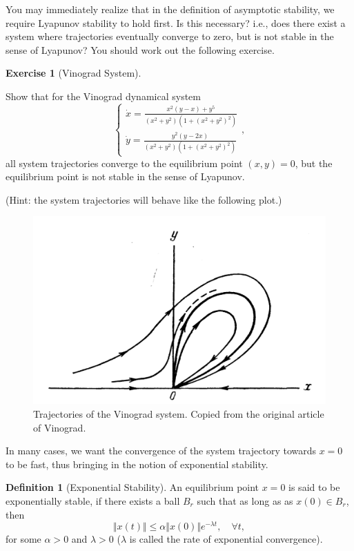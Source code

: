 \documentclass[
]{book}
\theoremstyle{definition}
\newtheorem{definition}{Definition}[chapter]
\theoremstyle{definition}
\theoremstyle{definition}
\newtheorem{exercise}{Exercise}[chapter]
\theoremstyle{definition}
\theoremstyle{remark}
\begin{document}
You may immediately realize that in the definition of asymptotic stability, we require Lyapunov stability to hold first. Is this necessary? i.e., does there exist a system where trajectories eventually converge to zero, but is not stable in the sense of Lyapunov? You should work out the following exercise.

\begin{exercise}[Vinograd System]
\protect\hypertarget{exr:vinogradequation}{}\label{exr:vinogradequation}

Show that for the Vinograd dynamical system \citep{vinograd57-inapplicability}
\[
\begin{cases}
\dot{x} = \frac{x^2(y-x) + y^5}{(x^2+y^2)(1 + (x^2+y^2)^2)} \\
\dot{y} = \frac{y^2 (y - 2x)}{(x^2+y^2)(1 + (x^2+y^2)^2)}
\end{cases},
\]
all system trajectories converge to the equilibrium point \((x,y) = 0\), but the equilibrium point is not stable in the sense of Lyapunov.

(Hint: the system trajectories will behave like the following plot.)

\begin{figure}

{\centering \includegraphics[width=0.6\linewidth]{images/vinograd} 

}

\caption{Trajectories of the Vinograd system. Copied from the original article of Vinograd.}\label{fig:vinograd-system}
\end{figure}

\end{exercise}

In many cases, we want the convergence of the system trajectory towards \(x=0\) to be fast, thus bringing in the notion of exponential stability.

\begin{definition}[Exponential Stability]
\protect\hypertarget{def:exponentialstability}{}\label{def:exponentialstability}An equilibrium point \(x=0\) is said to be exponentially stable, if there exists a ball \(B_r\) such that as long as as \(x(0) \in B_r\), then
\[
\Vert x(t) \Vert \leq \alpha \Vert x(0) \Vert e^{-\lambda t}, \quad \forall t,
\]
for some \(\alpha > 0\) and \(\lambda > 0\) (\(\lambda\) is called the rate of exponential convergence).
\end{definition}
\end{document}
